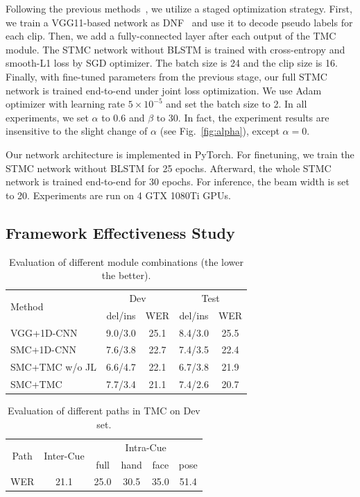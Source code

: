 \documentclass[letterpaper]{article} %
\begin{document}
Following the previous methods~\cite{resign,ian,cui-tmm19}, we utilize a staged optimization strategy. First, we train a VGG11-based network as DNF~\cite{cui-tmm19} and use it to decode pseudo labels for each clip. Then, we add a fully-connected layer after each output of the TMC module. The STMC network without BLSTM is trained with cross-entropy and smooth-L1 loss by SGD optimizer. The batch size is 24 and the clip size is 16. Finally, with fine-tuned parameters from the previous stage, our full STMC network is trained end-to-end under joint loss optimization. We use Adam optimizer with learning rate $5\times10^{-5}$ and set the batch size to 2. In all experiments, we set $\alpha$ to 0.6 and $\beta$ to 30. In fact, the experiment results are insensitive to the slight change of $\alpha$ (see Fig.~\ref{fig:alpha}), except $\alpha=0$.

Our network architecture is implemented in PyTorch. For finetuning, we train the STMC network without BLSTM for 25 epochs. Afterward, the whole STMC network is trained end-to-end for 30 epochs. For inference, the beam width is set to 20. Experiments are run on 4 GTX 1080Ti GPUs.


\subsection{Framework Effectiveness Study}
\begin{table}[tp]
    \centering
    \small
    \caption{Evaluation of different module combinations (the lower the better).} \label{tab:module}
    \begin{tabular}{l|cc|cc}
    \hline
    \multirow{2}{*}{Method} & \multicolumn{2}{c|}{Dev} & \multicolumn{2}{c}{Test} \\
                            & del/ins      & WER       & del/ins       & WER      \\ \hline
    VGG+1D-CNN              & 9.0/3.0      & 25.1      & 8.4/3.0       & 25.5     \\
    SMC+1D-CNN              & 7.6/3.8      & 22.7      & 7.4/3.5       & 22.4     \\
    SMC+TMC w/o JL          & 6.6/4.7      & 22.1      & 6.7/3.8       & 21.9     \\
    SMC+TMC                 & 7.7/3.4      & 21.1      & 7.4/2.6       & 20.7     \\ \hline
    \end{tabular}
\end{table}

\begin{table}[tp]
    \centering
    \small
    \caption{Evaluation of different paths in TMC on Dev set.} \label{tab:tmc}
    \begin{tabular*}{0.43\textwidth}{c|@{\extracolsep{\fill}}c|cccc}
    \hline
    \multirow{2}{*}{Path}&  \multirow{2}{*}{Inter-Cue} & \multicolumn{4}{c}{Intra-Cue}  \\
           &               & full     & hand   & face & pose \\ \hline
    WER &     21.1         & 25.0     & 30.5   & 35.0 & 51.4   \\ \hline
    \end{tabular*}
\end{table}
\end{document}
